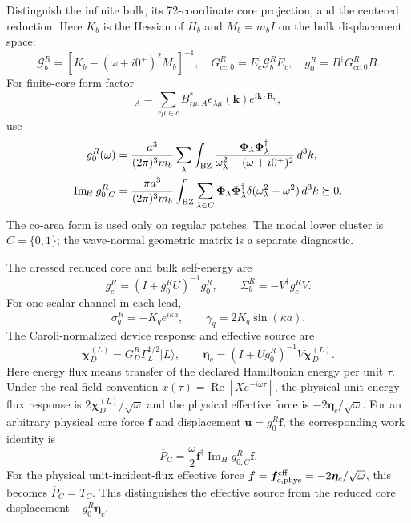 \documentclass[10pt,aps,onecolumn,notitlepage,nofootinbib]{revtex4-2}
\newcommand{\vk}{\bm k}
\newcommand{\vu}{\bm u}
\newcommand{\vf}{\bm f}
\newcommand{\vR}{\bm R}
\newcommand{\veta}{\bm\eta}
\newcommand{\vchi}{\bm\chi}
\newcommand{\ImH}{\operatorname{Im}_{\!H}}
\begin{document}
Distinguish the infinite bulk, its 72-coordinate core projection, and the centered reduction. Here $K_b$ is the Hessian of $H_b$ and $M_b=m_bI$ on the bulk displacement space:
\begin{equation}
 \mathcal G_b^R=[K_b-(\omega+i0^+)^2M_b]^{-1},
 \quad G_{cc,0}^R=E_c^{\dagger}\mathcal G_b^R E_c,
 \quad g_0^R=B^{\dagger}G_{cc,0}^RB.
\end{equation}
For finite-core form factor
\begin{equation}
 [\bm\Phi_\lambda(\vk)]_A
 =\sum_{r\mu\in c}B_{r\mu,A}^*e_{\lambda\mu}(\vk)e^{i\vk\cdot\vR_r},
\end{equation}
use
\begin{align}
 g_0^R(\omega)
 &=\frac{a^3}{(2\pi)^3m_b}\sum_\lambda\int_{\rm BZ}
 \frac{\bm\Phi_\lambda\bm\Phi_\lambda^{\dagger}}
 {\omega_\lambda^2-(\omega+i0^+)^2}\,d^3k,\\
 \ImH g_{0,C}^R
 &=\frac{\pi a^3}{(2\pi)^3m_b}\int_{\rm BZ}\sum_{\lambda\in C}
 \bm\Phi_\lambda\bm\Phi_\lambda^{\dagger}
 \delta(\omega_\lambda^2-\omega^2)\,d^3k\succeq0.
 \label{eq:sm-cluster-spectral}
\end{align}
The co-area form is used only on regular patches.  The modal lower cluster is $C=\{0,1\}$; the wave-normal geometric matrix is a separate diagnostic.

The dressed reduced core and bulk self-energy are
\begin{equation}
 g_c^R=(I+g_0^RU)^{-1}g_0^R,
 \qquad
 \Sigma_b^R=-V^{\dagger}g_c^RV.
\end{equation}
For one scalar channel in each lead,
\begin{equation}
 \sigma_q^R=-K_qe^{i\kappa a},
 \qquad \gamma_q=2K_q\sin(\kappa a).
\end{equation}
The Caroli-normalized device response and effective source are
\begin{equation}
 \vchi_D^{(L)}=G_D^R\Gamma_L^{1/2}|L\rangle,
 \qquad
 \veta_c=(I+Ug_0^R)^{-1}V\vchi_D^{(L)}.
\end{equation}
Here energy flux means transfer of the declared Hamiltonian energy per unit $\tau$. Under the real-field convention $x(\tau)=\operatorname{Re}[Xe^{-i\omega\tau}]$, the physical unit-energy-flux response is $2\vchi_D^{(L)}/\sqrt\omega$ and the physical effective force is $-2\veta_c/\sqrt\omega$.  For an arbitrary physical core force $\vf$ and displacement $\vu=g_0^R\vf$, the corresponding work identity is
\begin{equation}
 \overline P_C=\frac{\omega}{2}\vf^{\dagger}\ImH g_{0,C}^R\vf.
\end{equation}
For the physical unit-incident-flux effective force $\vf=\vf_{c,{\rm phys}}^{\rm eff}=-2\veta_c/\sqrt\omega$, this becomes $\overline P_C=T_C$. This distinguishes the effective source from the reduced core displacement $-g_0^R\veta_c$.
\end{document}
